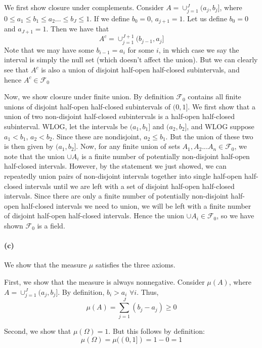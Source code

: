 \documentclass[10pt,letter]{article}
\begin{document}
We first show closure under complements. Consider $A = \cup_{j=1}^J (a_j, b_j]$, where $0 \le a_1 \le b_1 \le a_2 ... \le b_J \le 1$. If we define $b_0 = 0$, $a_{j+1} = 1$. Let us define $b_0 = 0$ and $a_{J+1} = 1$. Then we have that
\[ A^c = \cup_{j=1}^{J+1} (b_{j-1}, a_j] \] Note that we may have some $b_{i-1} = a_i$ for some $i$, in which case we say the interval is simply the null set (which doesn't affect the union). But we can clearly see that $A^c$ is also a union of disjoint half-open half-closed subintervals, and hence $A^c \in \mathcal{F}_0$

Now, we show closure under finite union. By definition $\mathcal{F}_0$ contains all finite unions of disjoint half-open half-closed subintervals of $(0,1]$. We first show that a union of two non-disjoint half-closed subintervals is a half-open half-closed subinterval. WLOG, let the intervals be $(a_1, b_1]$ and $(a_2, b_2]$, and WLOG suppose $a_1 < b_1$, $a_2 < b_2$. Since these are nondisjoint, $a_2 \le b_1$. But the union of these two is then given by $(a_1, b_2]$. Now, for any finite union of sets $A_1, A_2 ... A_n \in \mathcal{F}_0$, we note that the union $\cup A_i$ is a finite number of potentially non-disjoint half-open half-closed intervals. However, by the statement we just showed, we can repeatedly union pairs of non-disjoint intervals together into single half-open half-closed intervals until we are left with a set of disjoint half-open half-closed intervals. Since there are only a finite number of potentially non-disjoint half-open half-closed intervals we need to union, we will be left with a finite number of disjoint half-open half-closed intervals. Hence the union $\cup A_i \in \mathcal{F}_0$, so we have shown $\mathcal{F}_0$ is a field.
\paragraph{(c)}
We show that the measure $\mu$ satisfies the three axioms.

First, we show that the measure is always nonnegative. Consider $\mu(A)$, where $A = \cup_{j=1}^J (a_j, b_j]$. By definition,
$b_i > a_i$ $\forall i$. Thus, \[ \mu(A) = \sum_{j=1}^J (b_j - a_j) \ge 0 \]

Second, we show that $\mu(\Omega) = 1$. But this follows by definition:
\[ \mu(\Omega) = \mu((0,1]) = 1-0 = 1 \]
\end{document}
